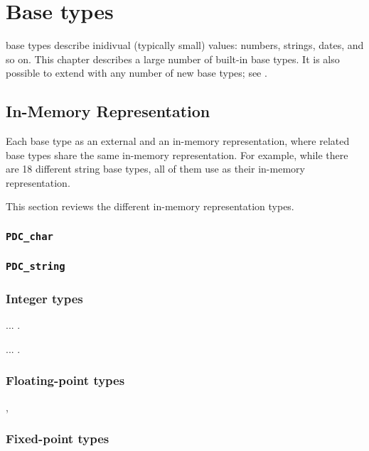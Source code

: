 \chapter{Base types}
\label{chap:base-types}

\PADSL{} base types describe inidivual (typically small) values: numbers, strings, dates, and so on.
This chapter describes a large number of built-in \PADSL{} base types.
It is also possible to extend \PADSL{} with any
number of new base types; see .

\section{In-Memory Representation}
\label{sec:base-types-rep}

Each base type as an external and an in-memory representation, where
related base types share the same in-memory representation.  For
example, while there are 18 different string base types, all of them
use  as their in-memory representation.

This section reviews the different in-memory representation types.

\subsection{{\tt PDC\_char}}

\subsection{{\tt PDC\_string}}

\subsection{Integer types}

 ... .

 ... .

\subsection{Floating-point types}

, 

\subsection{Fixed-point types}


